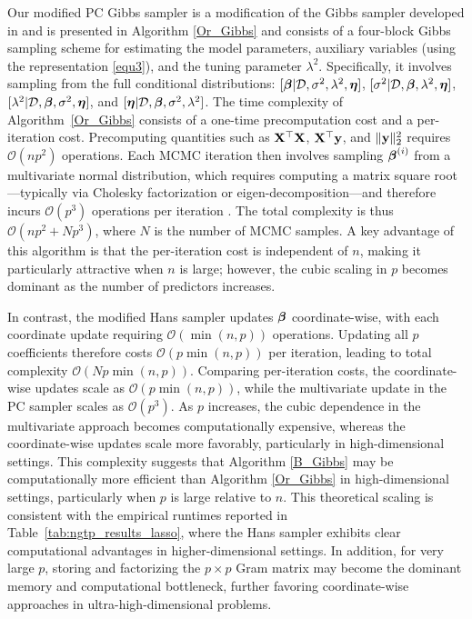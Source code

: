 Our modified PC Gibbs sampler is a modification of the Gibbs sampler developed in \cite{park2008bayesian} and is presented in Algorithm \ref{Or_Gibbs} and consists of a four-block Gibbs sampling scheme for estimating the model parameters, auxiliary variables (using the representation \eqref{equ3}), and the tuning parameter $\lambda^2$.  Specifically, it involves sampling from the full conditional distributions:
$[{\boldsymbol \beta}|{\mathcal D},\sigma^2,\lambda^2,{\boldsymbol \eta}]$, 
$[\sigma^2|{\mathcal D},{\boldsymbol \beta},\lambda^2,{\boldsymbol \eta}]$, 
$[\lambda^2|{\mathcal D},{\boldsymbol \beta},\sigma^2,{\boldsymbol \eta}]$, and 
$[{\boldsymbol \eta}|{\mathcal D},{\boldsymbol \beta},\sigma^2,\lambda^2]$.
The time complexity of Algorithm~\ref{Or_Gibbs} consists of a one-time precomputation cost and a per-iteration cost. Precomputing quantities such as ${\bf X}^\top{\bf X}$, ${\bf X}^\top{\bf y}$, and $\|{\bf y}\|_2^2$ requires $\mathcal{O}(np^2)$ operations. Each MCMC iteration then involves sampling ${\boldsymbol \beta}^{(i)}$ from a multivariate normal distribution, which requires computing a matrix square root—typically via Cholesky factorization or eigen-decomposition—and therefore incurs $\mathcal{O}(p^3)$ operations per iteration \citep{golub13}. The total complexity is thus $\mathcal{O}(np^2 + Np^3)$, where $N$ is the number of MCMC samples. A key advantage of this algorithm is that the per-iteration cost is independent of $n$, making it particularly attractive when $n$ is large; however, the cubic scaling in $p$ becomes dominant as the number of predictors increases.

In contrast, the modified Hans sampler updates ${\boldsymbol \beta}$ coordinate-wise, with each coordinate update requiring $\mathcal{O}(\min(n,p))$ operations. Updating all $p$ coefficients therefore costs $\mathcal{O}(p \min(n,p))$ per iteration, leading to total complexity $\mathcal{O}(N p \min(n,p))$. Comparing per-iteration costs, the coordinate-wise updates scale as 
$\mathcal{O}(p \min(n,p))$, while the multivariate update in the PC sampler scales as 
$\mathcal{O}(p^3)$. As $p$ increases, the cubic dependence in the multivariate approach 
becomes computationally expensive, whereas the coordinate-wise updates 
scale more favorably, particularly in high-dimensional settings. This complexity suggests that Algorithm \ref{B_Gibbs} may be computationally more efficient than Algorithm \ref{Or_Gibbs} in high-dimensional settings, particularly when $p$ is large 
relative to $n$. This theoretical scaling is consistent with the empirical runtimes reported in Table~\ref{tab:ngtp_results_lasso}, where the Hans sampler exhibits clear computational advantages in higher-dimensional settings. In addition, for very large $p$, storing and factorizing the $p \times p$ Gram matrix may become the dominant memory and computational bottleneck, further favoring coordinate-wise approaches in ultra-high-dimensional problems.


